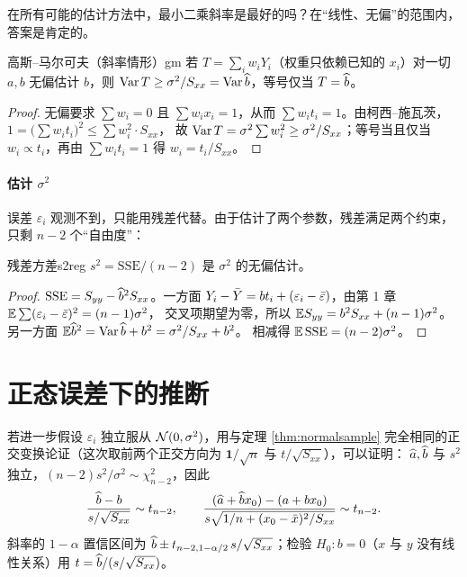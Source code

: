 在所有可能的估计方法中，最小二乘斜率是最好的吗？在“线性、无偏”的范围内，答案是肯定的。

\begin{theorem}{高斯–马尔可夫（斜率情形）}{gm}
若 $T=\sum_iw_iY_i$（权重只依赖已知的 $x_i$）对一切 $a,b$ 无偏估计 $b$，则 $\operatorname{Var} T\ge\sigma^2/S_{xx}=\operatorname{Var}\widehat{b}$，等号仅当 $T=\widehat{b}$。
\end{theorem}
\begin{proof}
无偏要求 $\sum w_i=0$ 且 $\sum w_ix_i=1$，从而 $\sum w_it_i=1$。由柯西–施瓦茨，$1=\big(\sum w_it_i\big)^2\le\sum w_i^2\cdot S_{xx}$，
故 $\operatorname{Var} T=\sigma^2\sum w_i^2\ge\sigma^2/S_{xx}$；等号当且仅当 $w_i\propto t_i$，再由 $\sum w_it_i=1$ 得 $w_i=t_i/S_{xx}$。
\end{proof}

\paragraph{估计 $\sigma^2$}
误差 $\varepsilon_i$ 观测不到，只能用残差代替。由于估计了两个参数，残差满足两个约束，只剩 $n-2$ 个“自由度”：

\begin{proposition}{残差方差}{s2reg}
$s^2=\mathrm{SSE}/(n-2)$ 是 $\sigma^2$ 的无偏估计。
\end{proposition}
\begin{proof}
$\mathrm{SSE}=S_{yy}-\widehat{b}^2S_{xx}$。一方面 $Y_i-\bar{Y}=bt_i+(\varepsilon_i-\bar\varepsilon)$，由第 1 章 $\mathbb{E}\sum(\varepsilon_i-\bar\varepsilon)^2=(n-1)\sigma^2$，
交叉项期望为零，所以 $\mathbb{E} S_{yy}=b^2S_{xx}+(n-1)\sigma^2$。另一方面 $\mathbb{E}\widehat{b}^2=\operatorname{Var}\widehat{b}+b^2=\sigma^2/S_{xx}+b^2$。
相减得 $\mathbb{E}\,\mathrm{SSE}=(n-2)\sigma^2$。
\end{proof}

\section{正态误差下的推断}

若进一步假设 $\varepsilon_i$ 独立服从 $\mathcal{N}(0,\sigma^2)$，用与定理 \ref{thm:normalsample} 完全相同的正交变换论证（这次取前两个正交方向为 $\mathbf1/\sqrt n$ 与 $t/\sqrt{S_{xx}}$），可以证明：
$\widehat{a},\widehat{b}$ 与 $s^2$ 独立，$(n-2)s^2/\sigma^2\sim\chi^2_{n-2}$，因此
\[
\frac{\widehat{b}-b}{s/\sqrt{S_{xx}}}\sim t_{n-2},\qquad
\frac{(\widehat{a}+\widehat{b}x_0)-(a+bx_0)}{s\sqrt{1/n+(x_0-\bar{x})^2/S_{xx}}}\sim t_{n-2}.
\]
斜率的 $1-\alpha$ 置信区间为 $\widehat{b}\pm t_{n-2,1-\alpha/2}\,s/\sqrt{S_{xx}}$；检验 $H_0:b=0$（$x$ 与 $y$ 没有线性关系）用 $t=\widehat{b}/(s/\sqrt{S_{xx}})$。

